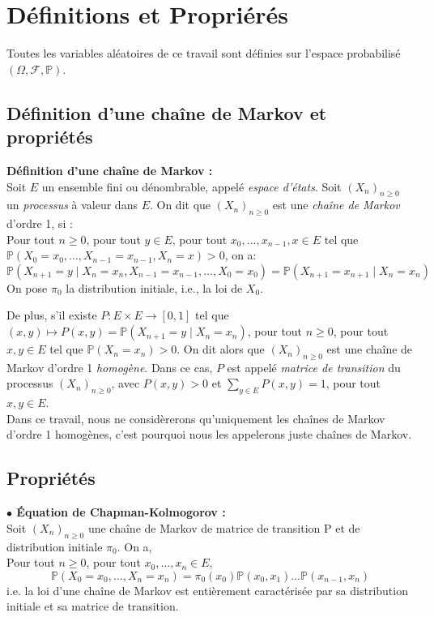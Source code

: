 \documentclass[11pt]{article}
\begin{document}
\section{Définitions et Propriérés}

Toutes les variables aléatoires de ce travail sont définies sur l'espace probabilisé $(\Omega, \mathcal{F}, \mathbb{P})$.
\subsection{Définition d'une chaîne de Markov et propriétés}

\textbf{Définition d'une chaîne de Markov :}\\
Soit $E$ un ensemble fini ou dénombrable, appelé \textit{espace d'états}. Soit $(X_n)_{n \ge 0}$ un \textit{processus} à valeur dans $E$.
On dit que $(X_n)_{n \ge 0}$ est une \textit{chaîne de Markov} d'ordre 1, si :\\
Pour tout $n \ge 0$, pour tout $y \in E$, pour tout $x_0,...,x_{n-1},x \in E$ tel que $\mathbb{P}(X_0 = x_0, \ldots, X_{n-1} = x_{n-1}, X_n = x) > 0$, on a:
\[
\mathbb{P}(X_{n+1} = y \mid X_n = x_n, X_{n-1} = x_{n-1},\ldots,X_0=x_0)=\mathbb{P}(X_{n+1}=x_{n+1} \mid X_n=x_n)
\]
On pose $\pi_0$ la distribution initiale, i.e., la loi de $X_0$.

De plus, s'il existe $P : E \times E \to [0,1]$ tel que $(x,y) \mapsto P(x,y)=\mathbb{P}(X_{n+1} = y \mid X_n = x_n)$, pour tout $n \ge 0$, pour tout $x,y \in E$ tel que $\mathbb{P}(X_n=x_n) > 0$.
On dit alors que $(X_n)_{n \ge 0}$ est une chaîne de Markov d'ordre 1 \textit{homogène}.
Dans ce cas, $P$ est appelé \textit{matrice de transition} du processus $(X_n)_{n \ge 0}$, avec $P(x,y)>0$ et $\sum_{y \in E}P(x,y)=1$, pour tout $x,y \in E$.\\

Dans ce travail, nous ne considèrerons qu'uniquement les chaînes de Markov d'ordre 1 homogènes, c'est pourquoi nous les appelerons juste chaînes de Markov.

\subsection{Propriétés}
\textbf{$\bullet$ Équation de Chapman-Kolmogorov :} \\
Soit $(X_n)_{n \ge 0}$ une chaîne de Markov de matrice de transition P et de distribution initiale $\pi_0$. On a,\\
Pour tout $n \ge 0$, pour tout $x_0, \ldots, x_n \in E$, 
\[
\mathbb{P}(X_0=x_0, \ldots, X_n=x_n) = \pi_0(x_0) \mathbb{P}(x_0,x_1) \ldots \mathbb{P}(x_{n-1},x_n)
\]
i.e. la loi d'une chaîne de Markov est entièrement caractérisée par sa distribution initiale et sa matrice de transition.
\end{document}
